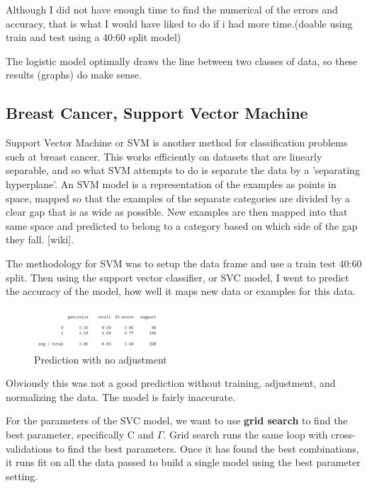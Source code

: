 \documentclass[conference]{IEEEtran}
\begin{document}
Although I did not have enough time to find the numerical of the errors and accuracy, that is what I would have liked to do if i had more time.(doable using train  and test using a 40:60 split model)

The logistic model optimally draws the line between two classes of data, so these results (graphs) do make sense.

\subsection{Breast Cancer, Support Vector Machine}
Support Vector Machine or SVM is another method for classification problems such at breast cancer. This works efficiently on datasets that are linearly separable, and so what SVM attempts to do is separate the data by a 'separating hyperplane'.  An SVM model is a representation of the examples as points in space, mapped so that the examples of the separate categories are divided by a clear gap that is as wide as possible. New examples are then mapped into that same space and predicted to belong to a category based on which side of the gap they fall. [wiki].

The methodology for SVM was to setup the data frame and use a train test 40:60 split. Then using the support vector classifier, or SVC model, I went to predict the accuracy of the model, how well it maps new data or examples for this data. 

\newpage
\begin{figure}[htbp]
\centerline{\includegraphics[width=50mm,scale=0.5]{imgs/class1}}
\caption{Prediction with no adjustment}
\label{fig}
\end{figure}
Obviously this was not a good prediction without training, adjustment, and normalizing the data. The model is fairly inaccurate. 

For the parameters of the SVC model, we want to use \textbf{grid search} to find the best parameter, specifically C and $\Gamma$. Grid search runs the same loop with cross-validations to find the best parameters. Once it has found the best combinations, it runs fit on all the data passed to build a single model using the best parameter setting.
\end{document}
